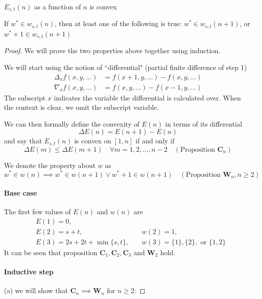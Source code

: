 \documentclass[]{article}
\begin{document}
\vspace{1cm}
\begin{lemma}[$n$-convexity]
$E_{s,t}(n)$ as a function of $n$ is convex
\end{lemma}
\begin{lemma}[$w$-induction]
	If $w^*\in w_{s,t}(n)$, then at least one of the following is true: $w^*\in w_{s,t}(n+1)$, or $w^*+1\in w_{s,t}(n+1)$
\end{lemma}
\begin{proof}
We will prove the two properties above together using induction.

We will start using the notion of ``differential" (partial finite difference of step 1)
\begin{align*}
\Delta_x f(x,y,\dots) &= f(x + 1,y,\dots) - f(x,y,\dots)\\
\nabla_x f(x,y,\dots) &= f(x ,y,\dots) - f(x - 1,y,\dots)
\end{align*}
The subscript $x$ indicates the variable the differential is calculated over. When the context is clear, we omit the subscript variable.

We can then formally define the convexity of $E(n)$ in terms of its differential
\[  
\Delta E(n) = E(n+1) - E(n)
\]
and say that $E_{s,t}(n)$ is convex on $[1,n]$ if and only if
\[
 \Delta E(m)\le \Delta E(m+1)\quad\forall m = 1,2,\dots,n-2\quad (\text{Proposition } \mathbf{C}_n)
\]

We denote the property about $w$ as
\[
w^*\in w(n) \implies w^* \in w(n+1) \lor w^*+1 \in w(n+1) \quad (\text{Proposition } \mathbf{W}_n, n\geq 2)
\]


\paragraph{Base case}
The first few values of $E(n)$ and $w(n)$ are 
\begin{align*}
&E(1) = 0,\ &&\\
&E(2) = s + t, \ &&w(2) = 1,\\
&E(3) = 2s + 2t + \min\{s, t\}, \ &&w(3) = \{1\}, \{2\},\text{ or }\{1,2\}
\end{align*}
It can be seen that proposition $\mathbf{C}_1, \mathbf{C}_2, \mathbf{C}_3$ and $\mathbf{W}_2$ hold.

\paragraph{Inductive step} (a) we will show that $\mathbf{C}_n \implies \mathbf{W}_n$ for $n\ge 2$:


\end{proof}
\end{document}
